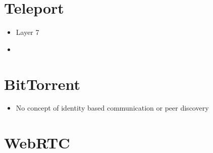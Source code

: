 \label{notes__02150-teleport.md}
\section{Teleport}\label{notes__02150-teleport.md__teleport}

\begin{itemize}
\tightlist
\item
  Layer 7
\item
\end{itemize}

\label{notes__02160-bittorrent.md}
\section{BitTorrent}\label{notes__02160-bittorrent.md__bittorrent}

\begin{itemize}
\tightlist
\item
  No concept of identity based communication or peer discovery
\end{itemize}

\label{notes__02170-webrtc.md}
\section{WebRTC}\label{notes__02170-webrtc.md__webrtc}

